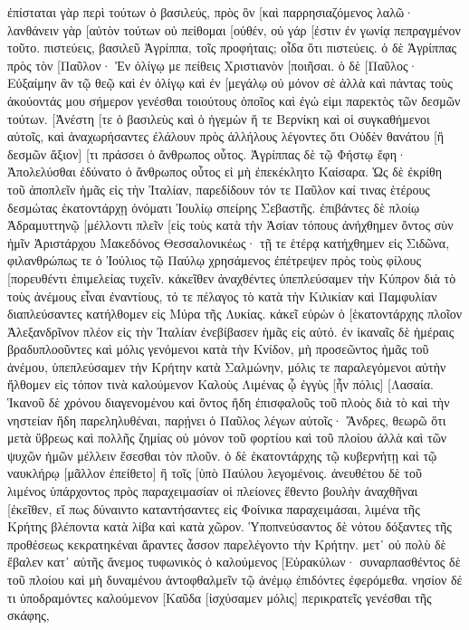 ἐπίσταται γὰρ περὶ τούτων ὁ βασιλεύς, πρὸς ὃν [καὶ παρρησιαζόμενος λαλῶ· λανθάνειν γὰρ [αὐτὸν τούτων οὐ πείθομαι [οὐθέν, οὐ γάρ [ἐστιν ἐν γωνίᾳ πεπραγμένον τοῦτο. 
πιστεύεις, βασιλεῦ Ἀγρίππα, τοῖς προφήταις; οἶδα ὅτι πιστεύεις. 
ὁ δὲ Ἀγρίππας πρὸς τὸν [Παῦλον· Ἐν ὀλίγῳ με πείθεις Χριστιανὸν [ποιῆσαι. 
ὁ δὲ [Παῦλος· Εὐξαίμην ἂν τῷ θεῷ καὶ ἐν ὀλίγῳ καὶ ἐν [μεγάλῳ οὐ μόνον σὲ ἀλλὰ καὶ πάντας τοὺς ἀκούοντάς μου σήμερον γενέσθαι τοιούτους ὁποῖος καὶ ἐγώ εἰμι παρεκτὸς τῶν δεσμῶν τούτων. 
[Ἀνέστη [τε ὁ βασιλεὺς καὶ ὁ ἡγεμὼν ἥ τε Βερνίκη καὶ οἱ συγκαθήμενοι αὐτοῖς, 
καὶ ἀναχωρήσαντες ἐλάλουν πρὸς ἀλλήλους λέγοντες ὅτι Οὐδὲν θανάτου [ἢ δεσμῶν ἄξιον] [τι πράσσει ὁ ἄνθρωπος οὗτος. 
Ἀγρίππας δὲ τῷ Φήστῳ ἔφη· Ἀπολελύσθαι ἐδύνατο ὁ ἄνθρωπος οὗτος εἰ μὴ ἐπεκέκλητο Καίσαρα. 
Ὡς δὲ ἐκρίθη τοῦ ἀποπλεῖν ἡμᾶς εἰς τὴν Ἰταλίαν, παρεδίδουν τόν τε Παῦλον καί τινας ἑτέρους δεσμώτας ἑκατοντάρχῃ ὀνόματι Ἰουλίῳ σπείρης Σεβαστῆς. 
ἐπιβάντες δὲ πλοίῳ Ἀδραμυττηνῷ [μέλλοντι πλεῖν [εἰς τοὺς κατὰ τὴν Ἀσίαν τόπους ἀνήχθημεν ὄντος σὺν ἡμῖν Ἀριστάρχου Μακεδόνος Θεσσαλονικέως· 
τῇ τε ἑτέρᾳ κατήχθημεν εἰς Σιδῶνα, φιλανθρώπως τε ὁ Ἰούλιος τῷ Παύλῳ χρησάμενος ἐπέτρεψεν πρὸς τοὺς φίλους [πορευθέντι ἐπιμελείας τυχεῖν. 
κἀκεῖθεν ἀναχθέντες ὑπεπλεύσαμεν τὴν Κύπρον διὰ τὸ τοὺς ἀνέμους εἶναι ἐναντίους, 
τό τε πέλαγος τὸ κατὰ τὴν Κιλικίαν καὶ Παμφυλίαν διαπλεύσαντες κατήλθομεν εἰς Μύρα τῆς Λυκίας. 
κἀκεῖ εὑρὼν ὁ [ἑκατοντάρχης πλοῖον Ἀλεξανδρῖνον πλέον εἰς τὴν Ἰταλίαν ἐνεβίβασεν ἡμᾶς εἰς αὐτό. 
ἐν ἱκαναῖς δὲ ἡμέραις βραδυπλοοῦντες καὶ μόλις γενόμενοι κατὰ τὴν Κνίδον, μὴ προσεῶντος ἡμᾶς τοῦ ἀνέμου, ὑπεπλεύσαμεν τὴν Κρήτην κατὰ Σαλμώνην, 
μόλις τε παραλεγόμενοι αὐτὴν ἤλθομεν εἰς τόπον τινὰ καλούμενον Καλοὺς Λιμένας ᾧ ἐγγὺς [ἦν πόλις] [Λασαία. 
Ἱκανοῦ δὲ χρόνου διαγενομένου καὶ ὄντος ἤδη ἐπισφαλοῦς τοῦ πλοὸς διὰ τὸ καὶ τὴν νηστείαν ἤδη παρεληλυθέναι, παρῄνει ὁ Παῦλος 
λέγων αὐτοῖς· Ἄνδρες, θεωρῶ ὅτι μετὰ ὕβρεως καὶ πολλῆς ζημίας οὐ μόνον τοῦ φορτίου καὶ τοῦ πλοίου ἀλλὰ καὶ τῶν ψυχῶν ἡμῶν μέλλειν ἔσεσθαι τὸν πλοῦν. 
ὁ δὲ ἑκατοντάρχης τῷ κυβερνήτῃ καὶ τῷ ναυκλήρῳ [μᾶλλον ἐπείθετο] ἢ τοῖς [ὑπὸ Παύλου λεγομένοις. 
ἀνευθέτου δὲ τοῦ λιμένος ὑπάρχοντος πρὸς παραχειμασίαν οἱ πλείονες ἔθεντο βουλὴν ἀναχθῆναι [ἐκεῖθεν, εἴ πως δύναιντο καταντήσαντες εἰς Φοίνικα παραχειμάσαι, λιμένα τῆς Κρήτης βλέποντα κατὰ λίβα καὶ κατὰ χῶρον. 
Ὑποπνεύσαντος δὲ νότου δόξαντες τῆς προθέσεως κεκρατηκέναι ἄραντες ἆσσον παρελέγοντο τὴν Κρήτην. 
μετ᾽ οὐ πολὺ δὲ ἔβαλεν κατ᾽ αὐτῆς ἄνεμος τυφωνικὸς ὁ καλούμενος [Εὐρακύλων· 
συναρπασθέντος δὲ τοῦ πλοίου καὶ μὴ δυναμένου ἀντοφθαλμεῖν τῷ ἀνέμῳ ἐπιδόντες ἐφερόμεθα. 
νησίον δέ τι ὑποδραμόντες καλούμενον [Καῦδα [ἰσχύσαμεν μόλις] περικρατεῖς γενέσθαι τῆς σκάφης, 
